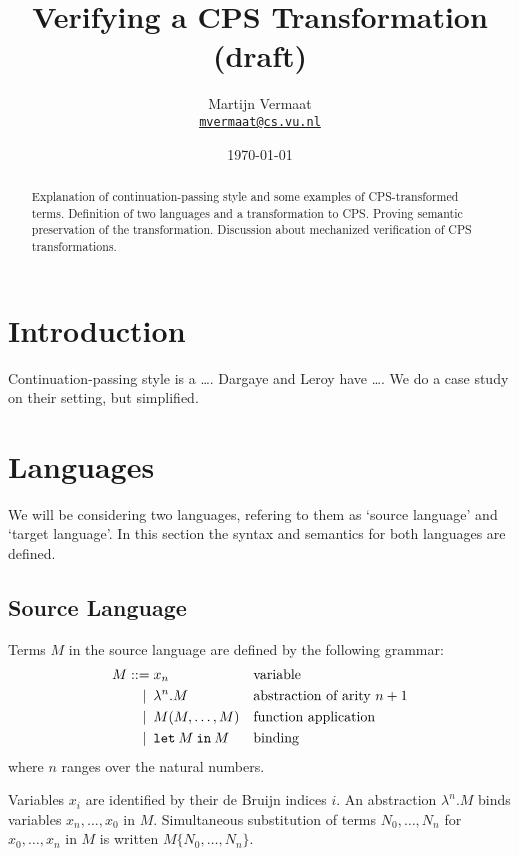 \documentclass[a4paper,11pt,draft]{article}
\title{\sffamily Verifying a CPS Transformation (draft)}
\author{
  Martijn Vermaat\\[0.3em]
  \href{mailto:mvermaat@cs.vu.nl}{\texttt{mvermaat@cs.vu.nl}}
}
\date{\today}
\newcommand{\kw}[1]{\mathtt{#1}}
\begin{document}
\maketitle


\begin{abstract}
  Explanation of continuation-passing style and some examples of CPS-transformed
  terms. Definition of two languages and a transformation to CPS. Proving
  semantic preservation of the transformation. Discussion about mechanized
  verification of CPS transformations.
\end{abstract}


\section{Introduction}\label{sec:introduction}

Continuation-passing style is a \ldots. Dargaye and Leroy
\cite{Dargaye-Leroy-07} have \ldots. We do a case study on their setting, but
simplified.


\section{Languages}\label{sec:languages}

We will be considering two languages, refering to them as `source language' and
`target language'. In this section the syntax and semantics for both languages
are defined.

\subsection{Source Language}

Terms $M$ in the source language are defined by the following grammar:
\begin{align*}
M ::=             &\; x_{n}
                  && \text{variable} \\
\llap{\textbar\:} &\; \lambda^{n}.M
                  && \text{abstraction of arity $n+1$} \\
\llap{\textbar\:} &\; M(M, \ldots, M)
                  && \text{function application} \\
\llap{\textbar\:} &\; \kw{let} \: M \: \kw{in} \: M
                  && \text{binding}
\end{align*}
where $n$ ranges over the natural numbers.

Variables $x_{i}$ are identified by their de Bruijn indices $i$.
An abstraction $\lambda^{n}.M$ binds variables $x_{n}, \ldots, x_{0}$ in $M$.
Simultaneous substitution of terms $N_{0}, \ldots, N_{n}$ for
$x_{0}, \ldots, x_{n}$ in $M$ is written $M\{N_{0}, \ldots, N_{n}\}$.
\end{document}
